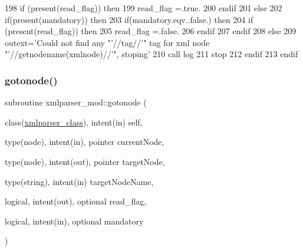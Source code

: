 \begin{DoxyCode}
198         \textcolor{keywordflow}{if} (\textcolor{keyword}{present}(read\_flag)) \textcolor{keywordflow}{then}
199             read\_flag =.true.
200 \textcolor{keywordflow}{        endif}
201     \textcolor{keywordflow}{else}
202         \textcolor{keywordflow}{if}(\textcolor{keyword}{present}(mandatory)) \textcolor{keywordflow}{then}
203             \textcolor{keywordflow}{if}(mandatory.eqv..false.) \textcolor{keywordflow}{then}
204                 \textcolor{keywordflow}{if} (\textcolor{keyword}{present}(read\_flag)) \textcolor{keywordflow}{then}
205                     read\_flag =.false.
206 \textcolor{keywordflow}{                endif}
207 \textcolor{keywordflow}{            endif}
208         \textcolor{keywordflow}{else}
209             outext=\textcolor{stringliteral}{'Could not find any "'}//tag//\textcolor{stringliteral}{'" tag for xml node "'}//getnodename(xmlnode)//\textcolor{stringliteral}{'", stoping'}
210             \textcolor{keyword}{call }log%
211             stop
212 \textcolor{keywordflow}{        endif}
213 \textcolor{keywordflow}{    endif}
\end{DoxyCode}
\mbox{\label{namespacexmlparser__mod_acd860c3d06a25fc422edbcc3d356d976}} 
\subsubsection{\texorpdfstring{gotonode()}{gotonode()}}
{\footnotesize\ttfamily subroutine xmlparser\+\_\+mod\+::gotonode (\begin{DoxyParamCaption}\item[{class(\mbox{\hyperlink{structxmlparser__mod_1_1xmlparser__class}{xmlparser\+\_\+class}}), intent(in)}]{self,  }\item[{type(node), intent(in), pointer}]{current\+Node,  }\item[{type(node), intent(out), pointer}]{target\+Node,  }\item[{type(string), intent(in)}]{target\+Node\+Name,  }\item[{logical, intent(out), optional}]{read\+\_\+flag,  }\item[{logical, intent(in), optional}]{mandatory }\end{DoxyParamCaption})\hspace{0.3cm}{\ttfamily [private]}}



